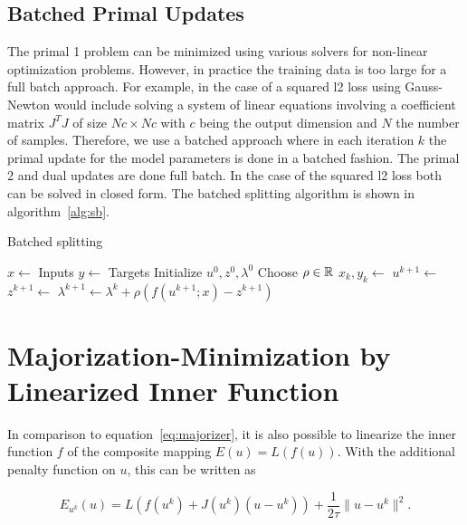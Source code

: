 \documentclass[english,11pt,a4paper]{article}
\begin{document}
\subsection{Batched Primal Updates}

The primal 1 problem can be minimized using various solvers for non-linear optimization problems. However, in practice the training data is too large for a full batch approach. For example, in the case of a squared l2 loss using Gauss-Newton would include solving a system of linear equations involving a coefficient matrix $J^T J$ of size $Nc \times Nc$ with $c$ being the output dimension and $N$ the number of samples. Therefore, we use a batched approach where in each iteration $k$ the primal update for the model parameters is done in a batched fashion. The primal 2 and dual updates are done full batch. In the case of the squared l2 loss both can be solved in closed form. The batched splitting algorithm is shown in algorithm~\ref{alg:sb}.

\begin{algorithm}
	\caption{Batched splitting}
	\label{alg:sb}
	\begin{algorithmic}[1]
		\State $x \gets$ Inputs
		\State $y \gets$ Targets
		\State Initialize $u^0, z^0, \lambda^0$
		\State Choose $\rho \in \mathbb{R}$
			\State $x_k, y_k \gets$ 
			\State $u^{k+1} \gets$  
			\State $z^{k+1} \gets$  
			\State $\lambda^{k+1} \gets \lambda^k + \rho (f(u^{k+1};x)-z^{k+1})$ 
		\EndFor
	\end{algorithmic}
\end{algorithm}

\section{Majorization-Minimization by Linearized Inner Function}


In comparison to equation~\ref{eq:majorizer}, it is also possible to linearize the inner function $f$ of the composite mapping $E(u) = L(f(u))$. With the additional penalty function on $u$, this can be written as

\begin{equation}
	E_{u^k}(u) = L(f(u^k) + J(u^k)(u-u^k)) + \frac{1}{2 \tau} \| u - u^k \|^2.	\label{eq:composite_inner_linearization}
\end{equation}
\end{document}
